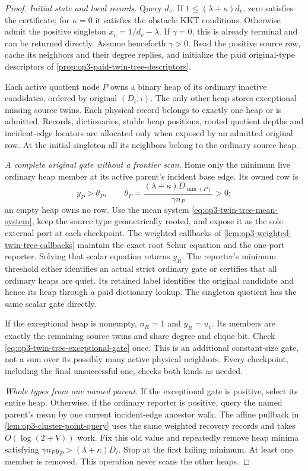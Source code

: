 \begin{proof}
\emph{Initial state and local records.}
Query $d_v$. If $1\leq(\lambda+\kappa)d_v$, zero satisfies the certificate;
for $\kappa=0$ it satisfies the obstacle KKT conditions. Otherwise admit
the positive singleton $x_v=1/d_v-\lambda$. If $\gamma=0$, this is already
terminal and can be returned directly. Assume henceforth $\gamma>0$.
Read the positive source row, cache its neighbors and their degree replies,
and initialize the paid original-type descriptors of
\cref{prop:op3-paid-twin-tree-descriptors}.

Each active quotient node $P$ owns a binary heap of its ordinary inactive
candidates, ordered by original $(D_i,i)$. The only other heap stores
exceptional missing source twins. Each physical record belongs to exactly
one heap or is admitted. Records, dictionaries, stable heap positions,
rooted quotient depths and incident-edge locators are allocated only when
exposed by an admitted original row. At the initial singleton all its
neighbors belong to the ordinary source heap.

\emph{A complete original gate without a frontier scan.}
Home only the minimum live ordinary heap member at its active parent's
incident base edge. Its owned row is
\[
 y_P>\theta_P,\qquad
 \theta_P=\frac{(\lambda+\kappa)D_{\min(P)}}{\gamma n_P}>0;
\]
an empty heap owns no row. Use the mean system
\eqref{eq:op3-twin-tree-mean-system}, keep the source type geometrically
rooted, and expose it as the sole external port at each checkpoint.
The weighted callbacks of \cref{lem:op3-weighted-twin-tree-callbacks}
maintain the exact root Schur equation and the one-port reporter. Solving
that scalar equation returns $y_R$. The reporter's minimum threshold
either identifies an actual strict ordinary gate or certifies that all
ordinary heaps are quiet. Its retained label identifies the original
candidate and hence its heap through a paid dictionary lookup. The
singleton quotient has the same scalar gate directly.

If the exceptional heap is nonempty, $n_R=1$ and $y_R=u_v$. Its members
are exactly the remaining source twins and share degree and clique bit.
Check \eqref{eq:op3-twin-tree-exceptional-gate} once. This is an additional
constant-size gate, not a sum over its possibly many active physical
neighbors. Every checkpoint, including the final unsuccessful one, checks
both kinds as needed.

\emph{Whole types from one named parent.}
If the exceptional gate is positive, select its entire heap. Otherwise,
if the ordinary reporter is positive, query the named parent's mean by
one current incident-edge ancestor walk. The affine pullback in
\cref{lem:op3-cluster-point-query} uses the same weighted recovery records
and takes $O(\log(2+V))$ work. Fix this old value and repeatedly remove
heap minima satisfying
$\gamma n_Py_P>(\lambda+\kappa)D_i$. Stop at the first failing minimum.
At least one member is removed. This operation never scans the other heaps.


\end{proof}
